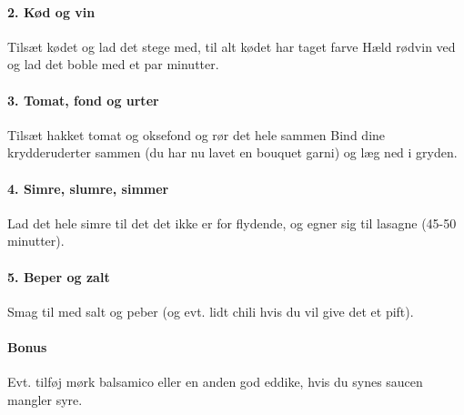 \paragraph*{2. Kød og vin}
Tilsæt kødet og lad det stege med, til alt kødet har taget farve
Hæld rødvin ved og lad det boble med et par minutter.

\paragraph*{3. Tomat, fond og urter}
Tilsæt hakket tomat og oksefond og rør det hele sammen
Bind dine krydderuderter sammen (du har nu lavet en bouquet garni) og læg ned i gryden.

\paragraph*{4. Simre, slumre, simmer}
Lad det hele simre til det det ikke er for flydende, og egner sig til lasagne (45-50 minutter).


\paragraph*{5. Beper og zalt}Smag til med salt og peber (og evt. lidt chili hvis du vil give det et pift).


\paragraph*{Bonus} Evt. tilføj mørk balsamico eller en anden god eddike, hvis du synes saucen mangler syre.